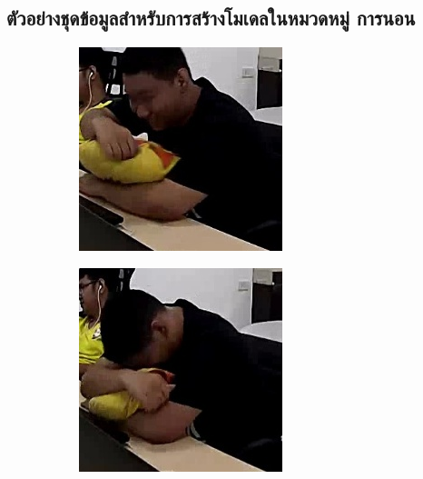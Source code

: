 \clearpage
\subsection*{ตัวอย่างชุดข้อมูลสำหรับการสร้างโมเดลในหมวดหมู่ การนอน}
\begin{figure}[!ht]
    \centering
   \begin{subfigure}[b]{0.45\linewidth}
      \includegraphics[width=\linewidth]{appendix/sleep/000_CXS0_D0_000043.jpg}
    \end{subfigure}
    \begin{subfigure}[b]{0.45\linewidth}
      \includegraphics[width=\linewidth]{appendix/sleep/000_CXS0_D0_000052.jpg}

\end{subfigure}
\end{figure}
